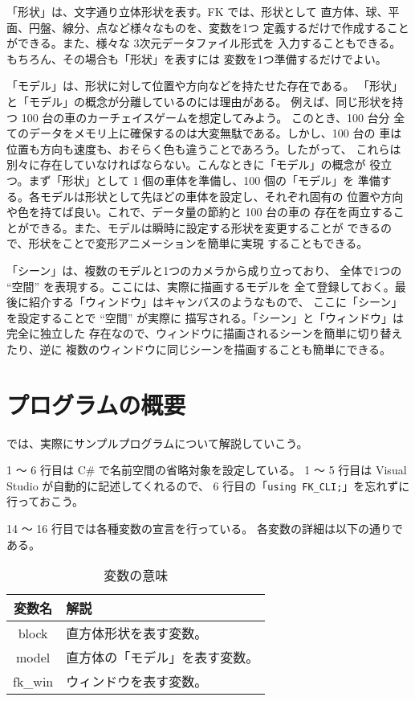 「形状」は、文字通り立体形状を表す。FK では、形状として
直方体、球、平面、円盤、線分、点など様々なものを、変数を1つ
定義するだけで作成することができる。また、様々な 3次元データファイル形式を
入力することもできる。もちろん、その場合も「形状」を表すには
変数を1つ準備するだけでよい。

「モデル」は、形状に対して位置や方向などを持たせた存在である。
「形状」と「モデル」の概念が分離しているのには理由がある。
例えば、同じ形状を持つ 100 台の車のカーチェイスゲームを想定してみよう。
このとき、100 台分
全てのデータをメモリ上に確保するのは大変無駄である。しかし、100 台の
車は位置も方向も速度も、おそらく色も違うことであろう。したがって、
これらは別々に存在していなければならない。こんなときに「モデル」の概念が
役立つ。まず「形状」として 1 個の車体を準備し、100 個の「モデル」を
準備する。各モデルは形状として先ほどの車体を設定し、それぞれ固有の
位置や方向や色を持てば良い。これで、データ量の節約と 100 台の車の
存在を両立することができる。また、モデルは瞬時に設定する形状を変更することが
できるので、形状をことで変形アニメーションを簡単に実現
することもできる。

「シーン」は、複数のモデルと1つのカメラから成り立っており、
全体で1つの ``空間'' を表現する。ここには、実際に描画するモデルを
全て登録しておく。最後に紹介する「ウィンドウ」はキャンバスのようなもので、
ここに「シーン」を設定することで ``空間'' が実際に
描写される。「シーン」と「ウィンドウ」は完全に独立した
存在なので、ウィンドウに描画されるシーンを簡単に切り替えたり、逆に
複数のウィンドウに同じシーンを描画することも簡単にできる。

\section{プログラムの概要}
では、実際にサンプルプログラムについて解説していこう。

1 〜 6 行目は C\# で名前空間の省略対象を設定している。
1 〜 5 行目は Visual Studio が自動的に記述してくれるので、
6 行目の「\verb+using FK_CLI;+」を忘れずに行っておこう。

14 〜 16 行目では各種変数の宣言を行っている。
各変数の詳細は以下の通りである。

\begin{table}[H]
\caption{変数の意味}
\label{tbl:samp1}
\begin{center}
\begin{tabular}{|c|l|}
\hline
変数名 & 解説 \\ \hline \hline
block & 直方体形状を表す変数。\\ \hline
model & 直方体の「モデル」を表す変数。\\ \hline
fk\_win & ウィンドウを表す変数。\\ \hline
\end{tabular}
\end{center}
\end{table}

